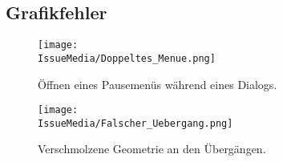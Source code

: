 %



\clearpage


	
	
\subsection*{Grafikfehler}



%
%	
%	
%


\begin{figure}[ht]

	\centering
	\label{Anhang:Grafikfehler:Dialog_Pause}
	
	\texttt{[image: \\IssueMedia/Doppeltes\_Menue.png]}
	
	\caption{Öffnen eines Pausemenüs während eines Dialogs.}

\end{figure}


\begin{figure}[ht]

	\centering
	\label{Anhang:Grafikfehler:Verschmolzene_Geometrie}
	
	\texttt{[image: \\IssueMedia/Falscher\_Uebergang.png]}
	
	\caption{Verschmolzene Geometrie an den Übergängen.}

\end{figure}

